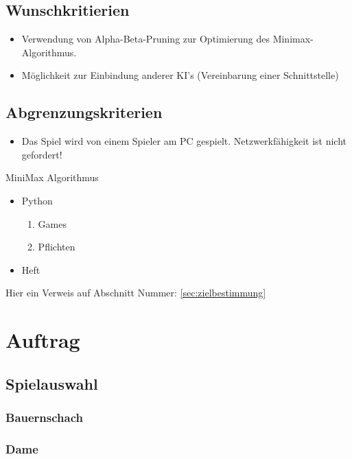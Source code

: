 \documentclass[14pt]{scrartcl}
\begin{document}
\subsection{Wunschkritierien}

\begin{itemize}
    \item Verwendung von Alpha-Beta-Pruning zur Optimierung des Minimax-Algorithmus.
    \item Möglichkeit zur Einbindung anderer KI’s (Vereinbarung einer Schnittstelle)
\end{itemize}


\subsection{Abgrenzungskriterien}

\begin{itemize}
    \item Das Spiel wird von einem Spieler am PC gespielt. Netzwerkfähigkeit ist nicht gefordert!
\end{itemize}

MiniMax Algorithmus

\begin{itemize}
    \item Python
    \begin{enumerate}
        \item Games
        \item Pflichten
    \end{enumerate}
    \item Heft
\end{itemize}



Hier ein Verweis auf Abschnitt Nummer: \ref{sec:zielbestimmung}

\section{Auftrag}


\subsection{Spielauswahl}
\subsubsection{Bauernschach}
\subsubsection{Dame}
\end{document}
